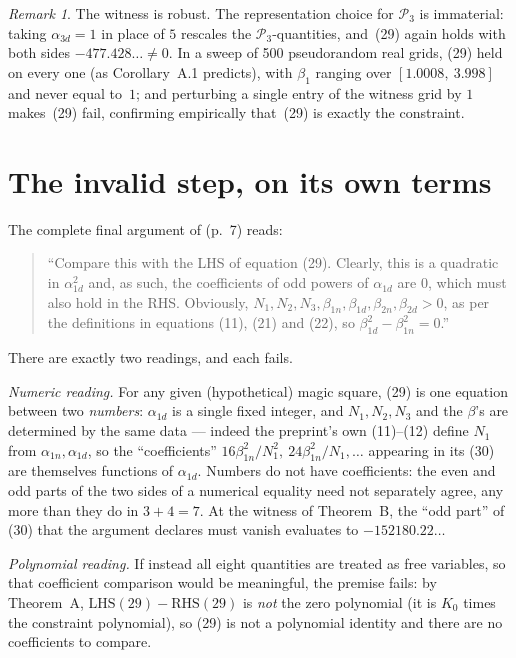 \documentclass[11pt]{amsart}
\theoremstyle{remark}
\newtheorem*{rmk}{Remark}
\newcommand{\cP}{\mathcal{P}}
\begin{document}
\begin{rmk}
The witness is robust. The representation choice for $\cP_3$ is
immaterial: taking $\alpha_{3d} = 1$ in place of $5$ rescales the
$\cP_3$-quantities, and~(29) again holds with both sides
$-477.428\ldots \neq 0$. In a sweep of 500 pseudorandom real grids,
(29) held on every one (as Corollary~A.1 predicts), with $\beta_1$
ranging over $[1.0008,\ 3.998]$ and never equal to~$1$; and perturbing
a single entry of the witness grid by $1$ makes~(29) fail, confirming
empirically that~(29) is exactly the constraint.
\end{rmk}

\section{The invalid step, on its own terms}\label{sec:step}

The complete final argument of \cite{Hill} (p.~7) reads:

\begin{quote}
``Compare this with the LHS of equation (29). Clearly, this is a
quadratic in $\alpha_{1d}^2$ and, as such, the coefficients of odd
powers of $\alpha_{1d}$ are 0, which must also hold in the RHS.
Obviously, $N_1, N_2, N_3, \beta_{1n}, \beta_{1d}, \beta_{2n},
\beta_{2d} > 0$, as per the definitions in equations (11), (21) and
(22), so $\beta_{1d}^2 - \beta_{1n}^2 = 0$.''
\end{quote}

There are exactly two readings, and each fails.

\emph{Numeric reading.} For any given (hypothetical) magic square,
(29) is one equation between two \emph{numbers}: $\alpha_{1d}$ is a
single fixed integer, and $N_1, N_2, N_3$ and the $\beta$'s are
determined by the same data --- indeed the preprint's own (11)--(12)
define $N_1$ from $\alpha_{1n}, \alpha_{1d}$, so the ``coefficients''
$16\beta_{1n}^2/N_1^2,\ 24\beta_{1n}^2/N_1, \ldots$ appearing in its
(30) are themselves functions of $\alpha_{1d}$. Numbers do not have
coefficients: the even and odd parts of the two sides of a numerical
equality need not separately agree, any more than they do in $3 + 4 =
7$. At the witness of Theorem~B, the ``odd part'' of (30) that the
argument declares must vanish evaluates to $-152180.22\ldots$

\emph{Polynomial reading.} If instead all eight quantities are treated
as free variables, so that coefficient comparison would be meaningful,
the premise fails: by Theorem~A, $\mathrm{LHS}(29) - \mathrm{RHS}(29)$
is \emph{not} the zero polynomial (it is $K_0$ times the constraint
polynomial), so (29) is not a polynomial identity and there are no
coefficients to compare.
\end{document}
